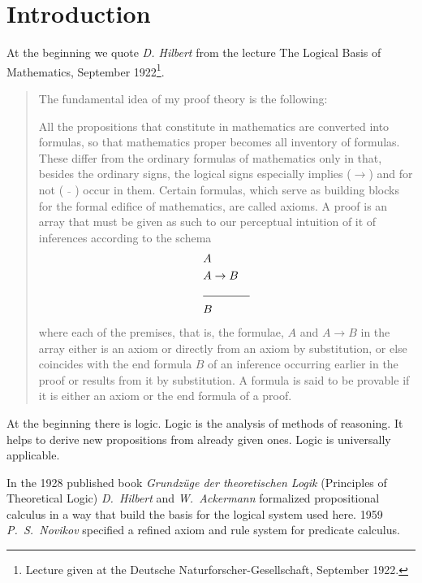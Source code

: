 \documentclass[a4paper,german,10pt,twoside]{book}
\theoremstyle{definition}
\theoremstyle{remark}
\begin{document}

\chapter*{Introduction} \label{chapter2} \hypertarget{chapter2}{}

At the beginning we quote \emph{D. Hilbert} from the lecture {\glqq The Logical Basis of Mathematics\grqq}, September 
1922\footnote{Lecture given at the Deutsche Naturforscher-Gesellschaft, September 1922.}.

\par
\begin{quote} {
\glqq The fundamental idea of my proof theory is the following:

\par
All the propositions that constitute in mathematics are converted into formulas, so that mathematics proper becomes all inventory of formulas. These differ from the ordinary formulas of mathematics only in that, besides the ordinary signs, 
the logical signs especially {\glqq implies\grqq} ($\rightarrow$) and for {\glqq not\grqq} ($\bar{\quad}$) occur in them. 
Certain formulas, which serve as building blocks for the formal edifice of mathematics, are called axioms. A proof is an array that must be given as such to our perceptual intuition of it of inferences according to the schema\\
\begin{eqnarray*}
& A & \\
& A \rightarrow B& \\
\cline{2-3}
 & B &
\end{eqnarray*}
where each of the premises, that is, the formulae, $A$ and $A \rightarrow B$ in the array either is an axiom or directly from an axiom by substitution, or else coincides with the end formula $B$ of an inference occurring earlier in the proof or results from it by substitution. A formula is said to be provable if it is either an axiom or the end formula of a proof.\grqq}
\end{quote}

\par
At the beginning there is logic. Logic is the analysis of methods of reasoning. It helps to derive new propositions from already given ones. Logic is universally applicable.

\par
In the 1928 published book \emph{Grundz{\"u}ge der theoretischen Logik} (Principles of Theoretical Logic) \emph{D.~Hilbert} and \emph{W.~Ackermann} formalized propositional calculus in a way that build the basis for the logical system used here. 1959 \emph{P.~S.~Novikov} specified a refined axiom and rule system for predicate calculus.
\end{document}
